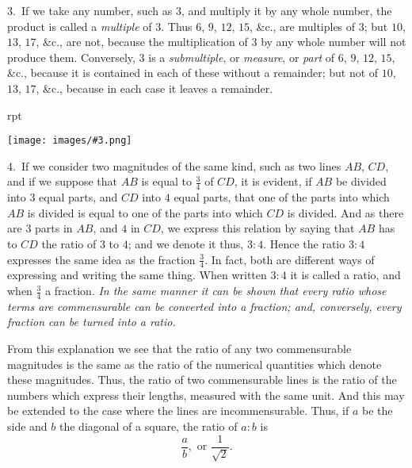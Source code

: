 \documentclass[oneside]{book}
\newcounter{wrapwidth}
\newcommand\imgflow[3]{
\setcounter{wrapwidth}{#1}
\begin{wrapfigure}[#2]{r}{\value{wrapwidth}pt}
\begin{center}
\vspace{-0.3in}
\texttt{[image: images/\#3.png]}
\end{center}
\end{wrapfigure}
}
\begin{document}
\begin{footnotesize}

3.~If we take any number, such as $3$, and multiply it by any
whole number, the product is called a \emph{multiple} of $3$. Thus $6$, $9$,
$12$, $15$, \&c., are multiples of $3$; but $10$, $13$, $17$, \&c., are not, because
the multiplication of $3$ by any whole number will not produce
them. Conversely, $3$ is a \emph{submultiple}, or \emph{measure}, or \emph{part}
of $6$, $9$, $12$, $15$, \&c., because it is contained in each of these without
a remainder; but not of $10$, $13$, $17$, \&c., because in each case
it leaves a remainder.

\imgflow{150}{6}{f257}

4.~If we consider two magnitudes of the same kind, such as
two lines $AB$, $CD$, and if we suppose that $AB$ is equal to $\frac{3}{4}$ of
$CD$, it is evident, if $AB$ be divided into $3$ equal parts, and $CD$ into
$4$ equal parts, that one of the
parts into which $AB$ is divided
is equal to one of the parts into
which $CD$ is divided. And as
there are $3$ parts in $AB$, and $4$
in $CD$, we express this relation
by saying that $AB$ has to
$CD$ the ratio of $3$ to $4$; and we denote it thus, $3:4$. Hence the
ratio $3:4$ expresses the same idea as the fraction $\frac{3}{4}$. In fact,
both are different ways of expressing and writing the same thing.
When written $3:4$ it is called a ratio, and when $\frac{3}{4}$ a fraction.
\emph{In the same manner it can be shown that every ratio whose terms
are commensurable can be converted into a fraction; and, conversely,
every fraction can be turned into a ratio.}\par\smallskip

From this explanation we see that the ratio of any two commensurable
magnitudes is the same as the ratio of the numerical
quantities which denote these magnitudes. Thus, the ratio of
two commensurable lines is the ratio of the numbers which express
their lengths, measured with the same unit. And this may
be extended to the case where the lines are incommensurable.
Thus, if $a$ be the side and $b$ the diagonal of a square, the ratio
of $a:b$ is
\[
\frac{a}{b}, \text{\ or } \frac{1}{\sqrt{2}}.
\]


\end{footnotesize}
\end{document}
